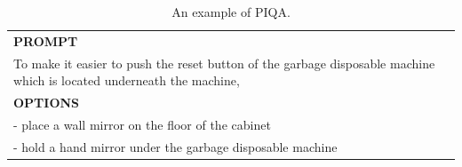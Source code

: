 \begin{table}[h]
    \centering \small
\begin{tabular}{p{12cm}}
\toprule
\textbf{PROMPT}\\
To make it easier to push the reset button of the garbage disposable machine which is located underneath the machine,\\
\midrule
\textbf{OPTIONS}\\
- place a wall mirror on the floor of the cabinet\\
- hold a hand mirror under the garbage disposable machine\\
\bottomrule
\end{tabular}
    \caption{\centering An example of PIQA.}
    \label{tab:PIQA_eval_format_example}
\end{table}

